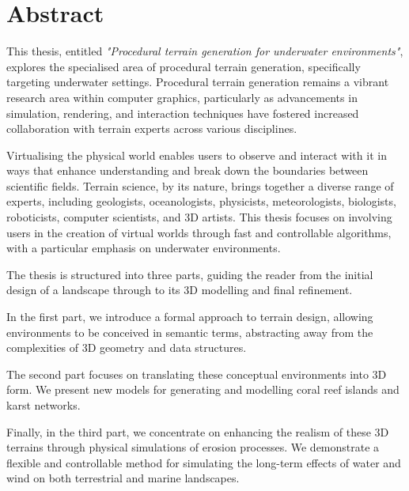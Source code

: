 \clearpage
\pagebreak

\section*{Abstract}

This thesis, entitled \textit{"Procedural terrain generation for underwater environments"}, explores the specialised area of procedural terrain generation, specifically targeting underwater settings. Procedural terrain generation remains a vibrant research area within computer graphics, particularly as advancements in simulation, rendering, and interaction techniques have fostered increased collaboration with terrain experts across various disciplines.

Virtualising the physical world enables users to observe and interact with it in ways that enhance understanding and break down the boundaries between scientific fields. Terrain science, by its nature, brings together a diverse range of experts, including geologists, oceanologists, physicists, meteorologists, biologists, roboticists, computer scientists, and 3D artists. This thesis focuses on involving users in the creation of virtual worlds through fast and controllable algorithms, with a particular emphasis on underwater environments.

The thesis is structured into three parts, guiding the reader from the initial design of a landscape through to its 3D modelling and final refinement.

In the first part, we introduce a formal approach to terrain design, allowing environments to be conceived in semantic terms, abstracting away from the complexities of 3D geometry and data structures.

The second part focuses on translating these conceptual environments into 3D form. We present new models for generating and modelling coral reef islands and karst networks.

Finally, in the third part, we concentrate on enhancing the realism of these 3D terrains through physical simulations of erosion processes. We demonstrate a flexible and controllable method for simulating the long-term effects of water and wind on both terrestrial and marine landscapes.







